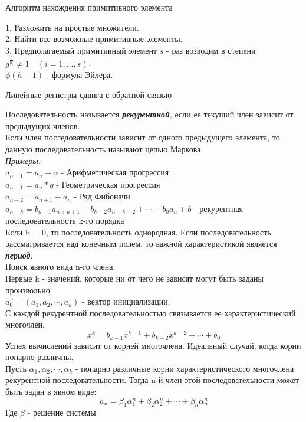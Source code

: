 \begin{title}
  Алгоритм нахождения примитивного элемента
\end{title}

1. Разложить на простые множители.\\
2. Найти все возможные примитивные элементы.\\
3. Предполагаемый примитивный элемент $s$ - раз возводим в степени
$g^{\frac{h}{p_i}} \neq 1
\quad (i = 1, ..., s)$.\\
$\phi(h-1)$ - формула Эйлера.\\
\begin{title}
  Линейные регистры сдвига с обратной связью
\end{title}

Последовательность называется {\bf \emph{рекурентной}}, если ее текущий член
зависит от предыдущих членов.\\
Если член последовательности зависит от одного предыдущего элемента, то данную
последовательность
называют цепью Маркова.\\
\emph{Примеры:}\\
$a_{n+1} = a_n + \alpha$ - Арифметическая прогрессия\\
$a_{n+1} = a_n * q $ - Геометрическая прогрессия\\
$a_{n+2} = a_{n+1} + a_n$ - Ряд Фибоначи\\
$a_{n+k} = b_{k-1} a_{n+k+1} + b_{k-2}a_{n+k-2} + \cdots + b_0 a_n + b$ -
рекурентная последовательность k-го порядка\\
Если b = 0, то последовательность однородная. Если последовательность
рассматривается над конечным полем, то важной
характеристикой является {\bf \emph {период}}.\\

Поиск явного вида n-го члена.\\
Первые k - значений, которые ни от чего не зависят могут быть заданы
произвольно:\\
$\vec{a_0} = (a_1, a_2, \cdots, a_k)$ - вектор инициализации.\\
С каждой рекурентной последовательностью связывается ее характеристический
многочлен.\\
\[x^k = b_{k-1} x^{k-1} + b_{k-2} x^{k-2}+ \cdots + b_0\]
Успех вычислений зависит от корней многочлена. Идеальный случай, когда корни
попарно различны.\\
Пусть $\alpha_1, \alpha_2, \cdots, \alpha_k$ - попарно различные корни
характеристического многочлена рекурентной
последовательности. Тогда n-й член этой последовательности может быть задан
в явном виде:
\[a_n = \beta_1\alpha_1^n + \beta_2\alpha_2^n + \cdots + \beta_n\alpha_n^n\]
Где $\beta$ - решение системы

